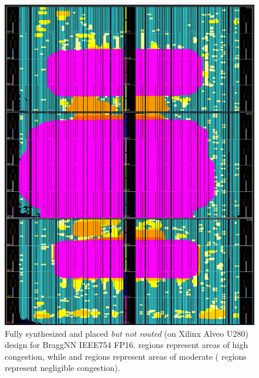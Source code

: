\begin{figure}
	\includegraphics[width=\columnwidth]{figures/alveo_congestion}
	\caption{Fully synthesized and placed \emph{but not routed} (on Xilinx Alveo U280) design for BraggNN IEEE754 FP16. \crule[magenta]{0.25cm}{0.25cm} regions represent areas of high congestion, while \crule[orange]{0.25cm}{0.25cm} and \crule[yellow]{0.25cm}{0.25cm} regions represent areas of moderate (\crule[teal]{0.25cm}{0.25cm} regions represent negligible congestion).}\label{fig:congestion_alveo}
\end{figure}

